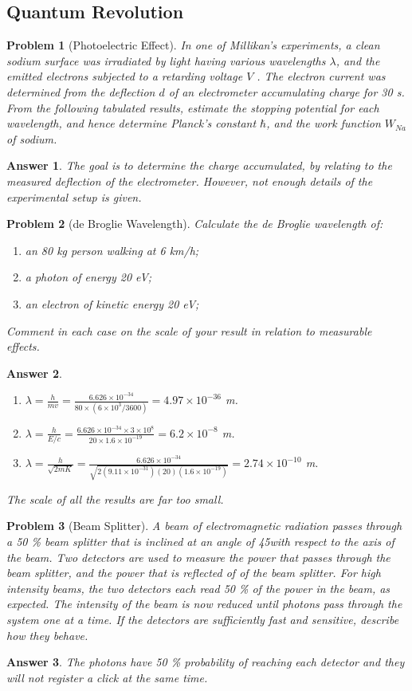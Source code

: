 \documentclass[a4paper]{article}
\newtheorem{ans}{Answer}[section]
\theoremstyle{new}
\newtheorem{qns}{Problem}[section]
\begin{document}
\subsection*{Quantum Revolution}
\begin{qns}[Photoelectric Effect]
In one of Millikan's experiments, a clean sodium surface was irradiated by light having various wavelengths $\lambda$, and the emitted electrons subjected to a retarding voltage $V$ . The electron current was determined from the deflection $d$ of an electrometer accumulating charge for 30 s. From the following tabulated results, estimate the stopping potential for each wavelength, and hence determine Planck's constant $\hbar$, and the work function $W_{Na}$ of sodium.
\end{qns}
\begin{ans}
The goal is to determine the charge accumulated, by relating to the measured deflection of the electrometer. However, not enough details of the experimental setup is given.
\end{ans}
\begin{qns}[de Broglie Wavelength]
Calculate the de Broglie wavelength of:
\begin{enumerate}[label=(\alph*)]
    \item an 80 kg person walking at 6 km/h;
    \item a photon of energy 20 eV;
    \item an electron of kinetic energy 20 eV;
\end{enumerate}
Comment in each case on the scale of your result in relation to measurable effects.
\end{qns}
\begin{ans}\leavevmode
\begin{enumerate}[label=(\alph*)]
\item $\lambda=\frac{h}{mv}=\frac{6.626\times10^{-34}}{80\times(6\times10^3/3600)}=4.97\times10^{-36}$ m.
\item $\lambda=\frac{h}{E/c}=\frac{6.626\times10^{-34}\times 3\times10^8}{20\times 1.6\times10^{-19}}=6.2\times10^{-8}$ m.
\item $\lambda=\frac{h}{\sqrt{2mK}}=\frac{6.626\times10^{-34}}{\sqrt{2(9.11\times10^{-31})(20)(1.6\times10^{-19})}}=2.74\times10^{-10}$ m.
\end{enumerate}
The scale of all the results are far too small.
\end{ans}
\begin{qns}[Beam Splitter]
A beam of electromagnetic radiation passes through a 50 \% beam splitter that is inclined at an angle of 45\degree with respect to the axis of the beam. Two detectors are used to measure the power that passes through the beam splitter, and the power that is reflected of of the beam splitter. For high intensity beams, the two detectors each read 50 \% of the power in the beam, as expected. The intensity of the beam is now reduced until photons pass through the system one at a time. If the detectors are sufficiently fast and sensitive, describe how they behave.
\end{qns}
\begin{ans}
The photons have 50 \% probability of reaching each detector and they will not register a click at the same time.
\end{ans}
\end{document}
